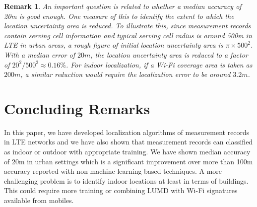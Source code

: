 \documentclass[conference, 10pt]{IEEEtran}
\newtheorem{remark}{Remark}
\begin{document}
\begin{remark} An important question is related to whether a median accuracy of 20m
is good enough. One measure of this to identify the extent to which the location
uncertainty area is reduced. To illustrate this, since measurement records contain
serving cell information and typical serving cell radius is around 500m in LTE in
urban areas, a rough figure of initial location uncertainty area is $\pi\times
500^2$. With a median error of $20m$, the location uncertainty area is reduced to a factor 
of $20^2/500^2 \approx 0.16\%$. For indoor localization, if a Wi-Fi coverage area is taken as 
$200m$, a similar reduction would require the localization error to be around $3.2m$.
\end{remark}

\section{Concluding Remarks}
\label{sec:concl}

In this paper, we have developed localization algorithms of measurement records in
LTE networks and we have also shown that measurement records can classified as indoor
or outdoor with appropriate training. We have shown median accuracy of 20m in urban
settings which is a significant improvement over more than 100m accuracy reported
with non machine learning based techniques. A more challenging problem is to identify
indoor locations at least in terms of buildings. This could require more training or
combining LUMD with Wi-Fi signatures available from mobiles.




%
%    

{%


}
\end{document}
